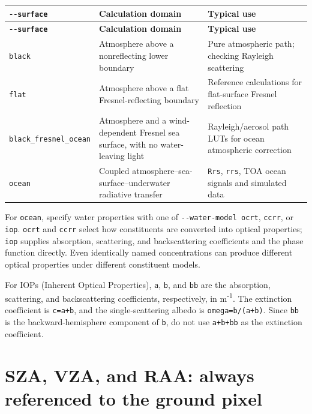 {\TableFont
\begin{longtable}{@{}>{\raggedright\arraybackslash}p{}>{\raggedright\arraybackslash}p{}>{\raggedright\arraybackslash}p{}@{}}
\toprule
\textbf{\texttt{-\allowbreak{}-\allowbreak{}surface}} & \textbf{Calculation domain} & \textbf{Typical use} \\
\midrule
\endfirsthead
\toprule
\textbf{\texttt{-\allowbreak{}-\allowbreak{}surface}} & \textbf{Calculation domain} & \textbf{Typical use} \\
\midrule
\endhead
\bottomrule
\endfoot
\texttt{black} & Atmosphere above a nonreflecting lower boundary & Pure atmospheric path; checking Rayleigh scattering \\
\texttt{flat} & Atmosphere above a flat Fresnel-reflecting boundary & Reference calculations for flat-surface Fresnel reflection \\
\texttt{black\_\allowbreak{}fresnel\_\allowbreak{}ocean} & Atmosphere and a wind-dependent Fresnel sea surface, with no water-leaving light & Rayleigh/aerosol path LUTs for ocean atmospheric correction \\
\texttt{ocean} & Coupled atmosphere--sea-surface--underwater radiative transfer & \texttt{Rrs}, \texttt{rrs}, TOA ocean signals and simulated data \\
\end{longtable}
}

For \texttt{ocean}, specify water properties with one of \texttt{-\allowbreak{}-\allowbreak{}water-\allowbreak{}model ocrt}, \texttt{ccrr}, or \texttt{iop}. \texttt{ocrt} and \texttt{ccrr} select how constituents are converted into optical properties; \texttt{iop} supplies absorption, scattering, and backscattering coefficients and the phase function directly. Even identically named concentrations can produce different optical properties under different constituent models.

For IOPs (Inherent Optical Properties), \texttt{a}, \texttt{b}, and \texttt{bb} are the absorption, scattering, and backscattering coefficients, respectively, in m\textsuperscript{-}\textsuperscript{1}. The extinction coefficient is \texttt{c=\allowbreak{}a+b}, and the single-scattering albedo is \texttt{omega=\allowbreak{}b/\allowbreak{}(a+b)}. Since \texttt{bb} is the backward-hemisphere component of \texttt{b}, do not use \texttt{a+b+bb} as the extinction coefficient.

\section{SZA, VZA, and RAA: always referenced to the ground pixel}
\label{sec:auto:01_concepts_geometry:3}

